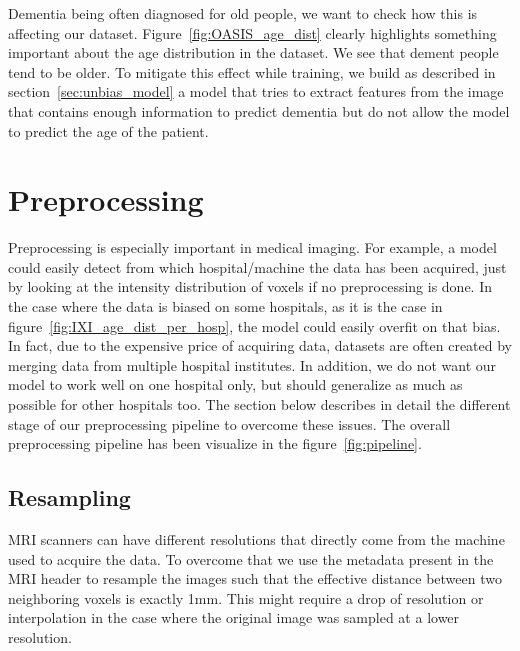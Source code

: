 Dementia being often diagnosed for old people, we want to check how this is affecting our dataset. Figure~\ref{fig:OASIS_age_dist} clearly highlights something important about the age distribution in the dataset. We see that dement people tend to be older. To mitigate this effect while training, we build as described in section~\ref{sec:unbias_model} a model that tries to extract features from the image that contains enough information to predict dementia but do not allow the model to predict the age of the patient. 


\section{Preprocessing}
Preprocessing is especially important in medical imaging. For example, a model could easily detect from which hospital/machine the data has been acquired, just by looking at the intensity distribution of voxels if no preprocessing is done. In the case where the data is biased on some hospitals, as it is the case in figure~\ref{fig:IXI_age_dist_per_hosp},  the model could easily overfit on that bias. In fact, due to the expensive price of acquiring data, datasets are often created by merging data from multiple hospital institutes. In addition, we do not want our model to work well on one hospital only, but should generalize as much as possible for other hospitals too. The section below describes in detail the different stage of our preprocessing pipeline to overcome these issues. The overall preprocessing pipeline has been visualize in the figure~\ref{fig:pipeline}.


\subsection{Resampling}
MRI scanners can have different resolutions that directly come from the machine used to acquire the data. To overcome that we use the metadata present in the MRI header to resample the images such that the effective distance between two neighboring voxels is exactly 1mm. This might require a drop of resolution or interpolation in the case where the original image was sampled at a lower resolution.


